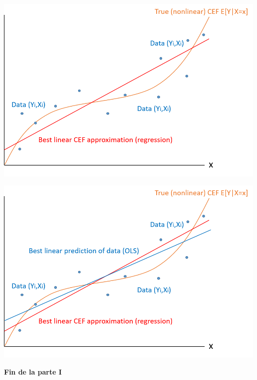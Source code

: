 \documentclass[11pt,handout,aspectratio=169]{beamer}
\begin{document}
\begin{frame}
	
	\begin{center}
		\hspace{0.7cm}\includegraphics[scale=0.7]{ols3.png}
	\end{center}
	
\end{frame}

\begin{frame}
	
	\begin{center}
		\hspace{0.7cm}\includegraphics[scale=0.7]{ols4.png}
	\end{center}
	
\end{frame}

\begin{frame}
\begin{center}
{\Huge \textbf{Fin de la parte I}}
\end{center}
\end{frame}
\end{document}
